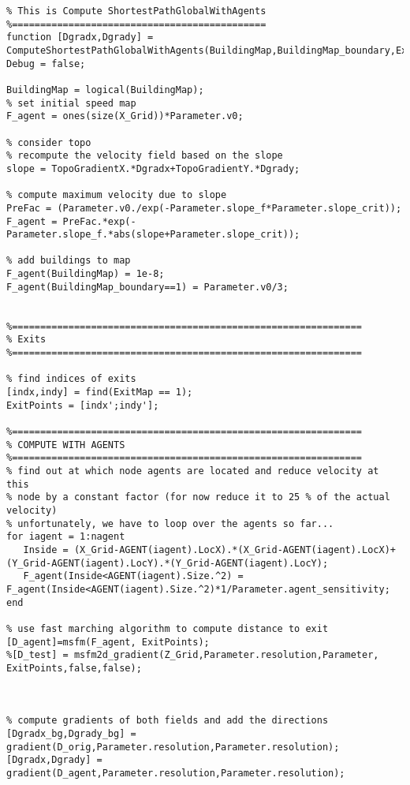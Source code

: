 \lstset{basicstyle=\footnotesize\ttfamily}
    
\begin{lstlisting}[breaklines]
%=============================================
% This is Compute ShortestPathGlobalWithAgents
%=============================================
function [Dgradx,Dgrady] = ComputeShortestPathGlobalWithAgents(BuildingMap,BuildingMap_boundary,ExitMap,X_Grid,Y_Grid,D_orig,Dgradx,Dgrady,TopoGradientX,TopoGradientY,AGENT,nagent,Parameter)
Debug = false;

BuildingMap = logical(BuildingMap);
% set initial speed map
F_agent = ones(size(X_Grid))*Parameter.v0;

% consider topo
% recompute the velocity field based on the slope
slope = TopoGradientX.*Dgradx+TopoGradientY.*Dgrady;

% compute maximum velocity due to slope
PreFac = (Parameter.v0./exp(-Parameter.slope_f*Parameter.slope_crit));
F_agent = PreFac.*exp(-Parameter.slope_f.*abs(slope+Parameter.slope_crit));

% add buildings to map
F_agent(BuildingMap) = 1e-8;
F_agent(BuildingMap_boundary==1) = Parameter.v0/3;


%==============================================================
% Exits
%==============================================================

% find indices of exits
[indx,indy] = find(ExitMap == 1);
ExitPoints = [indx';indy'];

%==============================================================
% COMPUTE WITH AGENTS
%==============================================================
% find out at which node agents are located and reduce velocity at this
% node by a constant factor (for now reduce it to 25 % of the actual velocity)
% unfortunately, we have to loop over the agents so far...
for iagent = 1:nagent
   Inside = (X_Grid-AGENT(iagent).LocX).*(X_Grid-AGENT(iagent).LocX)+(Y_Grid-AGENT(iagent).LocY).*(Y_Grid-AGENT(iagent).LocY);
   F_agent(Inside<AGENT(iagent).Size.^2) = F_agent(Inside<AGENT(iagent).Size.^2)*1/Parameter.agent_sensitivity;
end

% use fast marching algorithm to compute distance to exit
[D_agent]=msfm(F_agent, ExitPoints);
%[D_test] = msfm2d_gradient(Z_Grid,Parameter.resolution,Parameter, ExitPoints,false,false);



% compute gradients of both fields and add the directions
[Dgradx_bg,Dgrady_bg] = gradient(D_orig,Parameter.resolution,Parameter.resolution);
[Dgradx,Dgrady] = gradient(D_agent,Parameter.resolution,Parameter.resolution);



\end{lstlisting}
